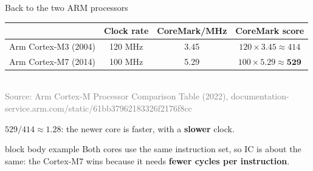 \documentclass[aspectratio=169,10pt]{beamer}
\newcommand{\keymsg}[1]{%
  \begin{beamercolorbox}[rounded=true,sep=0.1cm,wd=\textwidth]{block body example}
    \centering\footnotesize #1
  \end{beamercolorbox}}
\begin{document}
\begin{frame}{Back to the two ARM processors}
  \begin{center}
    \small
    \renewcommand{\arraystretch}{1.5}
    \begin{tabular}{lccc}
      \toprule
      & Clock rate & CoreMark/MHz & CoreMark score \\
      \midrule
      Arm Cortex-M3 (2004) & 120 MHz & 3.45 & $120 \times 3.45 \approx 414$ \\
      Arm Cortex-M7 (2014) & 100 MHz & 5.29 & $100 \times 5.29 \approx \mathbf{529}$ \\
      \bottomrule
    \end{tabular}\\[0.1cm]
    {\tiny\textcolor{gray}{Source: Arm Cortex-M Processor Comparison Table (2022), documentation-service.arm.com/static/61bb37962183326f2176f8cc}}
  \end{center}
  \vspace{0.2cm}
  \begin{center}
    \large $529 / 414 \approx \mathbf{1.28}$: the newer core is faster, with a \textbf{slower} clock.
  \end{center}
  \vfill
  \keymsg{Both cores use the same instruction set, so IC is about the same:
    the Cortex-M7 wins because it needs \textbf{fewer cycles per instruction}.}
\end{frame}
\end{document}
